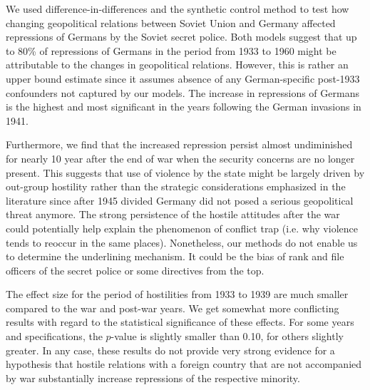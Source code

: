 We used difference-in-differences and the synthetic control method to test how changing geopolitical relations between Soviet Union and Germany  affected repressions of Germans by the Soviet secret police. 
Both models suggest that up to 80\% of  repressions of Germans in the period from 1933 to 1960 might be attributable to the changes in geopolitical relations. 
However, this is rather an upper bound estimate since it assumes absence of any German-specific  post-1933 confounders not captured by our models. 
The increase in repressions of Germans is the highest and most significant in the years following the German invasions in 1941. 


Furthermore, we find that the increased repression persist almost undiminished for nearly 10 year after the end of war when the security concerns are no longer present.
This  suggests that use of violence by the state might be largely driven by out-group 
hostility rather than the strategic considerations emphasized in the literature since after 1945 divided Germany did not posed a serious geopolitical threat anymore. 
The strong persistence of the hostile attitudes after the war could potentially help explain the phenomenon of conflict trap (i.e. why violence tends to reoccur in the same places). 
Nonetheless, our methods do not enable us to determine the underlining mechanism. It could be the bias of  rank and file officers of the secret police or some  directives from the top. %

The effect size for the period of hostilities from 1933 to 1939 are much smaller compared to the war and post-war years. 
We get somewhat more conflicting results with regard to the statistical significance of these effects. 
For some years and specifications, the $p$-value is slightly smaller than 0.10, for others slightly greater. 
In any case, these results do not provide very strong evidence for a hypothesis that hostile  relations with a foreign country that are not accompanied by war substantially increase repressions of the respective minority. 


